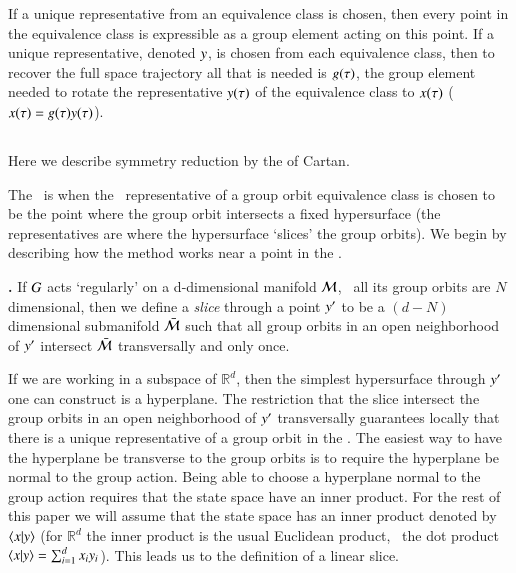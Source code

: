 If a unique representative from an equivalence class is chosen, then every point in the equivalence class is expressible as a group element acting on this point. If a unique representative, denoted $y$, is chosen from each equivalence class, then to recover the full space trajectory all that is needed is $g(\tau)$, the group element needed to rotate the representative $y(\tau)$ of the equivalence class to $x(\tau)$ (\ie\ $x(\tau)=g(\tau) y(\tau)$).


\subsection{\Mslices}
\label{sect:mslices}


Here we describe symmetry reduction by the
{\em {\mslices}} of
Cartan.

The \mslices\ is when the \reducedsp\ representative of a group orbit equivalence class is chosen to be the point where the group orbit intersects a fixed hypersurface (the representatives are where the hypersurface `slices' the group orbits). We begin by describing how the method works near a point in the \statesp.

\begin{definition}
\textbf{\Slice.}
If $G$ acts `regularly' on a d-dimensional manifold ${\cal M}$, \ie\ all its group orbits are $N$ dimensional, then we define a \emph{slice} through a point ${y'}$ to be a $(d\!-\!N)$ dimensional submanifold $\bar{\cal M}$ such that all group orbits in an open neighborhood of ${y'}$ intersect $\bar{\cal M}$ transversally and only once.
\end{definition}

If we are working in a subspace of $\mathbb{R}^d$, then the simplest hypersurface through ${y'}$ one can construct is a hyperplane. The restriction that the slice intersect the group orbits in an open neighborhood of ${y'}$ transversally guarantees locally that there is a unique representative of a group orbit in the \slice. The easiest way to have the hyperplane be transverse to the group orbits is to require the hyperplane be normal to the group action.
Being able to choose a hyperplane normal to the group action requires that the state space have an inner product. For the rest of this paper we will assume that the state space has an inner product denoted by $\braket{x}{y}$ (for $\mathbb{R}^d$ the inner product is the usual Euclidean product, \ie\ the dot product $\braket{x}{y}=\sum_{i=1}^d x_i y_i$).
This leads us to the definition of a linear slice.

